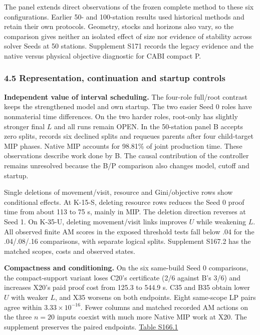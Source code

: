 \documentclass[
  american,
  11pt,
]{article}
\begin{document}
The panel extends direct observations of the frozen complete method to
these six configurations. Earlier 50- and 100-station results used
historical methods and retain their own protocols. Geometry, stocks and
horizons also vary, so the comparison gives neither an isolated effect
of size nor evidence of stability across solver Seeds at 50 stations.
Supplement S171 records the legacy evidence and the native versus
physical objective diagnostic for CABI compact P.

\subsubsection{4.5 Representation, continuation and startup
controls}\label{representation-continuation-and-startup-controls}

\textbf{Independent value of interval scheduling.} The four-role
full/root contrast keeps the strengthened model and own startup. The two
easier Seed 0 roles have nonmaterial time differences. On the two harder
roles, root-only has slightly stronger final \(L\) and all runs remain
OPEN. In the 50-station panel B accepts zero splits, records six
declined splits and requeues parents after four child-target MIP phases.
Native MIP accounts for 98.81\% of joint production time. These
observations describe work done by B. The causal contribution of the
controller remains unresolved because the B/P comparison also changes
model, cutoff and startup.

Single deletions of movement/visit, resource and Gini/objective rows
show conditional effects. At K-15-S, deleting resource rows reduces the
Seed 0 proof time from about 113 to 75 s, mainly in MIP. The deletion
direction reverses at Seed 1. On K-35-U, deleting movement/visit links
improves \(U\) while weakening \(L\). All observed finite AM scores in
the exposed threshold tests fall below .04 for the .04/.08/.16
comparisons, with separate logical splits. Supplement S167.2 has the
matched scopes, costs and observed states.

\textbf{Compactness and conditioning.} On the six same-build Seed 0
comparisons, the compact-support variant loses C20's certificate (2/6
against B's 3/6) and increases X20's paid proof cost from 125.3 to 544.9
s. C35 and B35 obtain lower \(U\) with weaker \(L\), and X35 worsens on
both endpoints. Eight same-scope LP pairs agree within
\(3.33\times10^{-16}\). Fewer columns and matched recorded AM actions on
the three \(n=20\) inputs coexist with much more Native MIP work at X20.
The supplement preserves the paired endpoints.
\href{https://github.com/yifanXovo/TailoredExact/blob/codex/round172-journal-manuscript/results/unified_exact_round137/supplement.md\#same-build-compact-support-endpoints}{Table
S166.1}
\end{document}
